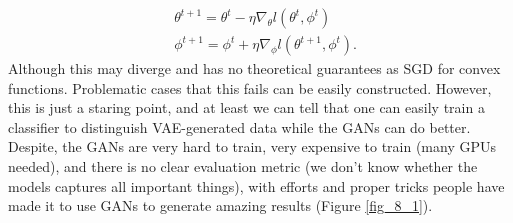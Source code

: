 \documentclass[../main.tex]{subfiles}
\begin{document}
\begin{align*}
&\theta^{t+1}=\theta^t-\eta \nabla_\theta l(\theta^t,\phi^t)\\
&\phi^{t+1}=\phi^t+\eta \nabla_\phi l(\theta^{t+1},\phi^t).
\end{align*}
Although this may diverge and has no theoretical guarantees as SGD for convex functions. Problematic cases that this fails can be easily constructed. However, this is just a staring point, and at least we can tell that one can easily train a classifier to distinguish VAE-generated data while the GANs can do better. Despite, the GANs are very hard to train, very expensive to train (many GPUs needed), and there is no clear evaluation metric (we don't know whether the models captures all important things), with efforts and proper tricks people have made it to use GANs to generate amazing results (Figure \ref{fig_8_1}).
\end{document}
